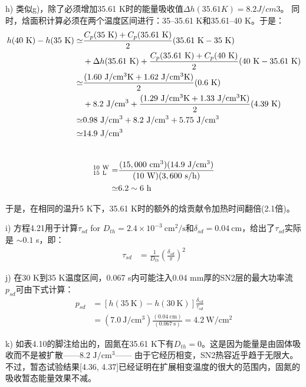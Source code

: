 h) 类似g)，除了必须增加35.61 K时的能量吸收值$\Delta h(35.61 K)=8.2 J/cm3$。
同时，焓面积计算必须在两个温度区间进行：35–35.61 K和35.61–40 K。于是：
\begin{align*}%
h(40\ \mathrm{K})-h(35\ \mathrm{K})\simeq&\frac{C_p(35\ \mathrm{K})+C_p(35.61\ \mathrm{K})}{2}(35.61\ \mathrm{K}-35\ \mathrm{K}) \\\notag
&+\Delta h(35.61\ \mathrm{K})+\frac{C_p(35.61\ \mathrm{K})+C_p(40\ \mathrm{K})}{2}(40\ \mathrm{K}-35.61\ \mathrm{K})\\\notag
\simeq&\frac{(1.60\ \mathrm{J/cm^3 K}+1.62\ \mathrm{J/cm^3 K})}{2}(0.6\ \mathrm{K})\\\notag
&+8.2\ \mathrm{J/cm^3}+\frac{(1.29\ \mathrm{J/cm^3 K}+1.33\ \mathrm{J/cm^3 K})}{2}(4.39\ \mathrm{K})\\\notag
\simeq&0.98\ \mathrm{J/cm^3}+8.2\ \mathrm{J/cm^3}+5.75\ \mathrm{J/cm^3}\\\notag
\simeq& 14.9\ \mathrm{J/cm^3}\\\notag
\end{align*}

\begin{align*}
[\Delta t(30\ \mathrm{K} \rightarrow 35\ \mathrm{K})]_{15\ \mathrm{L}}^{10\ \mathrm{W}}=&\frac{(15,000\ \mathrm{cm^3})(14.9\ \mathrm{J/cm^3})}{(10\ \mathrm{W})(3,600\ \mathrm{s/h})}\\\notag
\simeq&6.2\sim 6\ \mathrm{h} \notag
\end{align*}

于是，在相同的温升5 K下，35.61 K时的额外的焓贡献令加热时间翻倍(2.1倍)。

i) 方程4.21用于计算$\tau_{sd}$ for $D_{th} = 2.4\times 10^{−3} \ \mathrm{cm^2/s}$和$\delta_{sd}=0.04\ \mathrm{cm}$，给出了$\tau_{sd}$实际是 $\sim 0.1$ s，即：
\begin{align}%
\tau_{sd}&=\frac{1}{D_{th}}(\frac{\delta_{sd}}{\pi})^2
\end{align}

j) 在30 K到35 K温度区间，0.067 s内可能注入0.04 mm厚的SN2层的最大功率流$p_{sd}$可由下式计算：
\begin{align*}%
p_{sd}&=[h(35\ \mathrm{K})-h(30\ \mathrm{K})]\frac{\delta_{sd}}{\tau_{sd}}\\
&=(7.0\ \mathrm{J/cm^3})\frac{(0.04\ \mathrm{cm})}{(0.067\ \mathrm{s})}=4.2 \ \mathrm{W/cm^2}
\end{align*}

k) 如表4.10的脚注给出的，固氮在35.61 K下有$D_{th} = 0$。这是因为能量是由固体吸收而不是被扩散——8.2 $\mathrm{J/cm^3}$——
由于它经历相变，SN2热容近乎趋于无限大。
不过，暂态试验结果[4.36, 4.37]已经证明在扩展相变温度的很大的范围内，固氮的吸收暂态能量效果不减。

